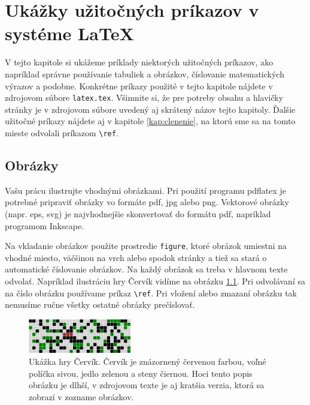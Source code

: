 \chapter[LaTeX]{Ukážky užitočných príkazov v systéme LaTeX}
\label{kap:latex}

V tejto kapitole si ukážeme príklady niektorých užitočných príkazov,
ako napríklad správne používanie tabuliek a obrázkov, číslovanie
matematických výrazov a podobne. Konkrétne príkazy použité v tejto
kapitole nájdete v zdrojovom súbore \verb'latex.tex'.  Všimnite si, že
pre potreby obsahu a hlavičky stránky je v zdrojovom súbore uvedený aj
skrátený názov tejto kapitoly. Ďalšie užitočné príkazy nájdete aj v
kapitole \ref{kap:clenenie}, na ktorú sme sa na tomto mieste odvolali
príkazom \verb'\ref'.

\section{Obrázky}

Vašu prácu ilustrujte vhodnými obrázkami. Pri použití programu
pdflatex je potrebné pripraviť obrázky vo formáte pdf, jpg alebo
png. Vektorové obrázky (napr. eps, svg) je najvhodnejšie skonvertovať
do formátu pdf, napríklad programom Inkscape.

Na vkladanie obrázkov použite prostredie \verb'figure', ktoré obrázok
umiestni na vhodné miesto, väčšinou na vrch alebo spodok stránky a
tiež sa stará o automatické číslovanie obrázkov. Na každý obrázok sa
treba v hlavnom texte odvolať. Napríklad ilustráciu hry Červík vidíme
na obrázku \ref{obr:cursus}. Pri odvolávaní sa na číslo obrázku
používame príkaz \verb'\ref'. Pri vložení alebo zmazaní obrázku tak
nemusíme ručne všetky ostatné obrázky prečíslovať.

\begin{figure}
\centerline{\includegraphics[width=0.4\textwidth]{images/cervik}}
\caption[Ukážka hry Červík]{Ukážka hry Červík. Červík je znázornený červenou farbou, voľné políčka sivou, jedlo zelenou a steny čiernou. Hoci tento popis obrázku je dlhší, v zdrojovom texte je aj kratšia verzia, ktorá sa zobrazí v zozname obrázkov.}
\label{obr:cursus}
\end{figure}

